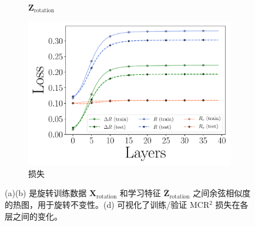 \documentclass[../../book-main.tex]{subfiles}
\begin{document}
\begin{example}[数字的不变分类]
\begin{figure}[t]
\begin{subfigure}[t]{0.3\textwidth}
        \caption{$\bm{Z}_{\text{rotation}}$}
    \end{subfigure}
    \hfill
    \begin{subfigure}[t]{0.32\textwidth}
        \centering
        \includegraphics[width=\textwidth]{figs_chap4/mnist1d-loss-traintest.pdf}
        \caption{损失}
    \end{subfigure}
    \caption{\small (a)(b) 是旋转训练数据 $\bm{X}_{\text{rotation}}$ 和学习特征 $\bar{\bm{Z}}_{\text{rotation}}$ 之间余弦相似度的热图，用于旋转不变性。(d) 可视化了训练/验证 MCR$^2$ 损失在各层之间的变化。}
    \label{fig:redu-invariant-1d-mnist-diagram}
\end{figure}

\end{example}
\end{document}
